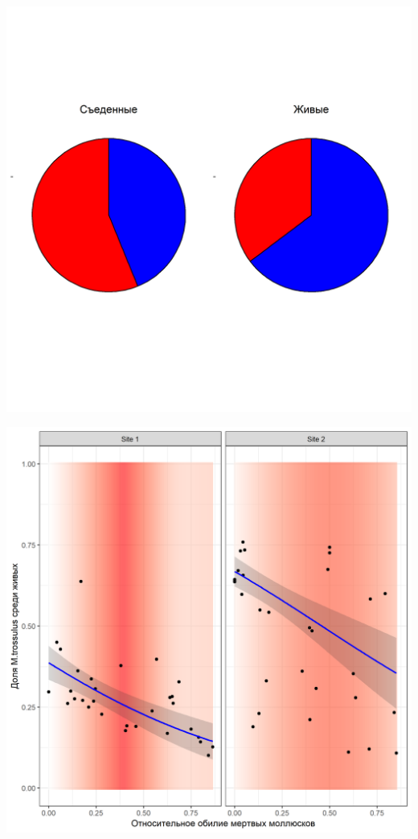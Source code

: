 \documentclass[20pt,a0,portrait]{a0poster}
\begin{document}
\begin{minipage}[t]{0.46\linewidth}
%
\begin{minipage}[t]{0.46\linewidth}		
	\begin{center}\vspace{0.1cm}
			\includegraphics[width=0.9\linewidth]{Pay_charts_aster.png}
			\label{Fig_pay_chart_aster}
		\end{center}
\end{minipage}\hspace{1cm}
%
\begin{minipage}[t]{0.46\linewidth}		
	\begin{center}\vspace{0.1cm}
			\includegraphics[width=0.9\linewidth]{Prop_dead_Prop_T.png}

\end{center}
\end{minipage}
\end{minipage}
\end{document}

